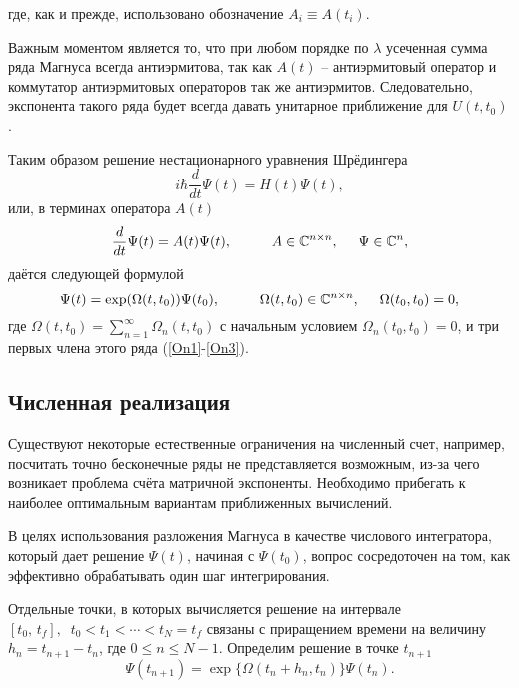 \documentclass[12pt]{article}
\numberwithin{equation}{section}
\begin{document}
где, как и прежде, использовано обозначение $A_i\equiv A(t_i)$.

Важным моментом является то, что при любом порядке по $\lambda $ усеченная сумма ряда Магнуса всегда антиэрмитова, так как $A(t)$ -- антиэрмитовый оператор и коммутатор антиэрмитовых операторов так же антиэрмитов. Следовательно, экспонента такого ряда будет всегда давать унитарное приближение для $U(t,t_0)$.

Таким образом решение нестационарного уравнения Шрёдингера 
\begin{equation}
i\hbar\frac{d}{d t}\Psi(t)=H(t)\Psi(t), 
\end{equation}
или, в терминах оператора $A(t)$
\begin{equation}
\label{dPsi}
\frac{d}{d t}\Psi(t)=A(t)\Psi(t), \hspace{1cm} A \in \mathbb{C}^{n\times n}, \hspace{0.5cm} \Psi \in \mathbb{C}^n,
\end{equation}
даётся следующей формулой
\begin{equation}
\Psi(t)=\exp(\Omega(t,t_0))\Psi(t_0), \hspace{1cm} \Omega(t,t_0) \in \mathbb{C}^{n\times n}, \hspace{0.5cm} \Omega(t_0,t_0)=0,
\end{equation}
где $\Omega(t,t_0)=\sum\limits_{n=1}^\infty\Omega_n(t,t_0)$ с начальным условием $\Omega_n(t_0,t_0)=0$, и три первых члена этого ряда (\ref{On1}-\ref{On3}).

\subsection{Численная реализация}

Существуют некоторые естественные ограничения на численный счет, например, посчитать точно бесконечные ряды не представляется возможным, из-за чего возникает проблема счёта матричной экспоненты. Необходимо прибегать к наиболее оптимальным вариантам приближенных вычислений.

В целях использования разложения Магнуса в качестве числового интегратора, который дает решение $\Psi(t)$, начиная с $\Psi(t_0)$, вопрос сосредоточен на том, как эффективно обрабатывать один шаг интегрирования.

Отдельные точки, в которых вычисляется решение на интервале $[t_0,\,t_f], \;\;t_0 < t_1 < \cdots < t_N = t_f$  связаны с приращением времени на величину $h_n=t_{n+1}-t_n$, где $0\leqslant n \leqslant N-1$. Определим решение в точке $t_{n+1}$
\begin{equation}
\Psi(t_{n+1})=\exp\{\Omega(t_n+h_n,t_n)\}\Psi(t_n).
\end{equation}
\end{document}
